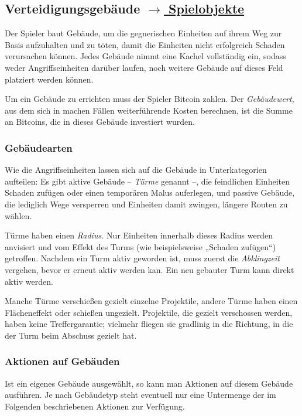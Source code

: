 \subsection[Verteidigungsgebäude]{Verteidigungsgebäude \hyperref[sec:defence]{\footnotesize $\rightarrow$ Spielobjekte}}
\label{sec:defence-concept}

Der Spieler baut Gebäude, um die gegnerischen Einheiten auf ihrem Weg zur Basis
aufzuhalten und zu töten, damit die Einheiten nicht erfolgreich Schaden
verursachen können. Jedes Gebäude nimmt eine Kachel vollständig ein, sodass
weder Angriffseinheiten darüber laufen, noch weitere Gebäude auf dieses Feld
platziert werden können.

Um ein Gebäude zu errichten muss der Spieler Bitcoin zahlen. Der
\emph{Gebäudewert,} aus dem sich in machen Fällen weiterführende Kosten
berechnen, ist die Summe an Bitcoins, die in dieses Gebäude investiert wurden.


\subsubsection{Gebäudearten}

Wie die Angriffseinheiten lassen sich auf die Gebäude in Unterkategorien
aufteilen: Es gibt aktive Gebäude -- \emph{Türme} genannt --, die feindlichen
Einheiten Schaden zufügen oder einen temporären Malus auferlegen, und passive
Gebäude, die lediglich Wege versperren und Einheiten damit zwingen, längere
Routen zu wählen.

Türme haben einen \emph{Radius.} Nur Einheiten innerhalb dieses Radius werden
anvisiert und vom Effekt des Turms (wie beispielsweise „Schaden zufügen“)
getroffen. Nachdem ein Turm aktiv geworden ist, muss zuerst die
\emph{Abklingzeit} vergehen, bevor er erneut aktiv werden kan. Ein neu gebauter
Turm kann direkt aktiv werden.

Manche Türme verschießen gezielt einzelne Projektile, andere Türme haben einen
Flächeneffekt oder schießen ungezielt. Projektile, die gezielt verschossen
werden, haben keine Treffergarantie; vielmehr fliegen sie gradlinig in die
Richtung, in die der Turm beim Abschuss gezielt hat.


\subsubsection{Aktionen auf Gebäuden}

Ist ein eigenes Gebäude ausgewählt, so kann man Aktionen auf diesem Gebäude
ausführen. Je nach Gebäudetyp steht eventuell nur eine Untermenge der im
Folgenden beschriebenen Aktionen zur Verfügung.

